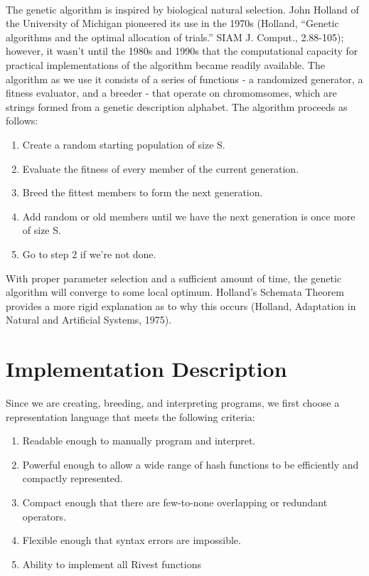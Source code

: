 \documentclass{article}
\begin{document}
\paragraph{}
The genetic algorithm is inspired by biological natural selection. John Holland of the University of Michigan pioneered its use in the 1970s (Holland, “Genetic algorithms and the optimal allocation of trials.” SIAM J. Comput., 2.88-105); however, it wasn't until the 1980s and 1990s that the computational capacity for practical implementations of the algorithm became readily available. The algorithm as we use it consists of a series of functions - a randomized generator, a fitness evaluator, and a breeder - that operate on chromomsomes, which are strings formed from a genetic description alphabet. The algorithm proceeds as follows:
\begin{enumerate}
	\item Create a random starting population of size S.
	\item Evaluate the fitness of every member of the current generation.
	\item Breed the fittest members to form the next generation.
	\item Add random or old members until we have the next generation is once more of size S.
	\item Go to step 2 if we're not done.
\end{enumerate}

With proper parameter selection and a sufficient amount of time, the genetic algorithm will converge to some local optimum. Holland's Schemata Theorem provides a more rigid explanation as to why this occurs (Holland, Adaptation in Natural and Artificial Systems, 1975).

\section{Implementation Description}
Since we are creating, breeding, and interpreting programs, we first choose a representation language that meets the following criteria:

\begin{enumerate}
\item Readable enough to manually program and interpret.
\item Powerful enough to allow a wide range of hash functions to be efficiently and compactly represented.
\item Compact enough that there are few-to-none overlapping or redundant operators.
\item Flexible enough that syntax errors are impossible.
\item Ability to implement all Rivest functions
\end{enumerate}
\end{document}
